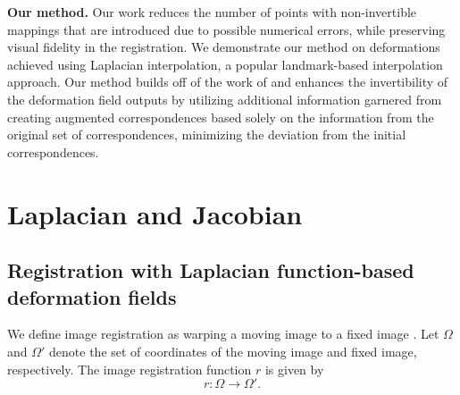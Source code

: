 \documentclass[lettersize,journal]{IEEEtran}
\begin{document}

\textbf{Our method.} 
Our work reduces the number of points with non-invertible mappings that are introduced due to possible numerical errors, while preserving visual fidelity in the registration. We demonstrate our method on deformations achieved using Laplacian interpolation, a popular landmark-based interpolation approach.    
Our method builds off of the work of \cite{AgarwalRobustRegistration, RegBoost2025} and enhances the invertibility of the deformation field outputs by utilizing additional information garnered from creating augmented correspondences based solely on the information from the original set of correspondences, minimizing the deviation from the initial correspondences.


\section{Laplacian and Jacobian}

\subsection{Registration with Laplacian function-based deformation fields}
\label{sec:laplacian_registration}

We define image registration as warping a moving image to a fixed image \cite{Yushkevich2023}. Let $\Omega$ and $\Omega'$ denote the set of coordinates of the moving image and fixed image, respectively. The image registration function $r$ is given by 
\begin{equation} \label{eq:image_registration_definition}
    r: \Omega \rightarrow \Omega'.
\end{equation}
\end{document}
